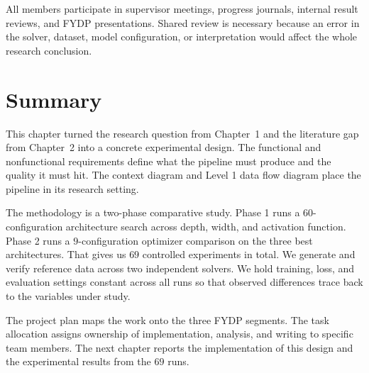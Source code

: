 All members participate in supervisor meetings, progress journals, internal result reviews, and FYDP presentations. Shared review is necessary because an error in the solver, dataset, model configuration, or interpretation would affect the whole research conclusion.

\section{Summary}

This chapter turned the research question from Chapter~1 and the literature gap from Chapter~2 into a concrete experimental design. The functional and nonfunctional requirements define what the pipeline must produce and the quality it must hit. The context diagram and Level 1 data flow diagram place the pipeline in its research setting.

The methodology is a two-phase comparative study. Phase 1 runs a $60$-configuration architecture search across depth, width, and activation function. Phase 2 runs a $9$-configuration optimizer comparison on the three best architectures. That gives us $69$ controlled experiments in total. We generate and verify reference data across two independent solvers. We hold training, loss, and evaluation settings constant across all runs so that observed differences trace back to the variables under study.

The project plan maps the work onto the three FYDP segments. The task allocation assigns ownership of implementation, analysis, and writing to specific team members. The next chapter reports the implementation of this design and the experimental results from the $69$ runs.

